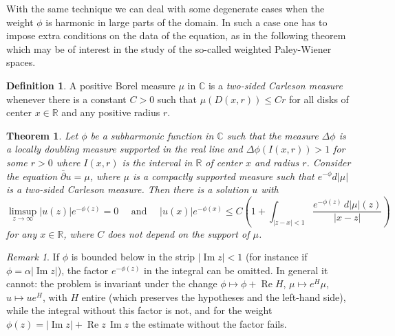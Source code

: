 \documentclass[12pt,twoside,final,psamsfonts]{amsart}
\theoremstyle{plain}
\newtheorem{teor}{Theorem}
\theoremstyle{remark}
\newtheorem*{remark}{Remark}
\theoremstyle{definition}
\newtheorem*{defi}{Definition}
\newcommand{\C}{{\mathbb C}}
\newcommand{\R}{{\mathbb R}}
\newcommand{\dbar}{\bar\partial}
\renewcommand{\Re}{\operatorname{Re}}
\renewcommand{\Im}{\operatorname{Im}}
\begin{document}
With the same technique we can deal with some degenerate cases when
the weight $\phi$ is harmonic in large parts of the domain. In such a case one
has to impose extra conditions on the data of the equation, as in the following
theorem which may be of interest in the study of the so-called weighted
Paley-Wiener spaces.

\begin{defi} 
A positive Borel measure $\mu$ in $\C$ is a \emph{two-sided Carleson measure} 
whenever there is a
constant $C>0$ such that $\mu(D(x,r))\le C r$ for all disks of center
$x\in\R$ and any positive radius $r$.  
\end{defi}

\begin{teor}\label{degenerat}
Let $\phi$ be a subharmonic function in $\C$ such that the measure $\Delta
\phi$ is a locally 
doubling measure supported in the real line and  $\Delta \phi
(I(x,r))>1$ for some $r>0$ where $I(x,r)$ is the interval in $\R$ of center $x$
and radius $r$. Consider the equation $\dbar u=\mu$, where $\mu$ is a compactly
supported measure such that $e^{-\phi}d|\mu|$ is a two-sided  Carleson measure.
Then there is a solution $u$ with
\[
\limsup_{z\to\infty} |u(z)|e^{-\phi(z)}=0 \quad \text{ and } \quad
|u(x)|e^{-\phi(x)}\le C \left(1+ \int_{|z-x|<1}\frac {e^{-\phi(z)}\,d|\mu|(z)}{|x-z|}\right)
\]
for any $x\in \R$, where $C$ does not depend on the support of $\mu$.
\end{teor}

\begin{remark}
If $\phi$ is bounded below in the strip $|\Im z|<1$ (for instance if
$\phi=\alpha|\Im z|$), the factor $e^{-\phi(z)}$ in the integral can be
omitted. In general it cannot: the problem is invariant under the change
$\phi\mapsto\phi+\Re H$, $\mu\mapsto e^{H}\mu$, $u\mapsto ue^{H}$, with $H$
entire (which preserves the hypotheses and the left-hand side), while the integral
without this factor is not, and for the weight
$\phi(z)=|\Im z|+\Re z\,\Im z$ the estimate without the factor fails.
\end{remark}
\end{document}
